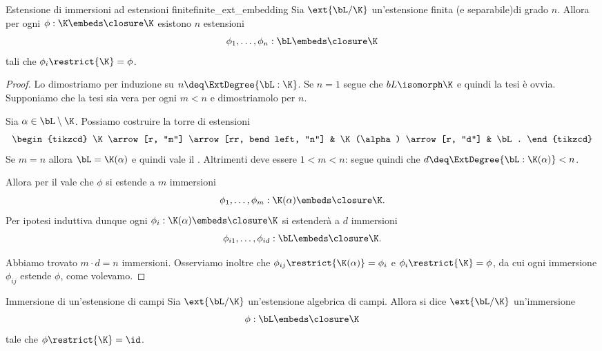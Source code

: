 \begin{theorem}
    {Estensione di immersioni ad estensioni finite}{finite_ext_embedding}
    Sia $\ext{\bL / \K}$ un'estensione finita (e separabile)di grado $n$. Allora per ogni $\phi : \K \embeds \closure\K$ esistono $n$ estensioni \[
        \phi_1, \dots, \phi_n : \bL \embeds \closure\K
    \] tali che $\phi_i\restrict{\K} = \phi$. 
\end{theorem}
\begin{proof}
    Lo dimostriamo per induzione su $n \deq \ExtDegree{\bL : \K}$.
     Se $n = 1$ segue che $bL \isomorph \K$ e quindi la tesi è ovvia.
     Supponiamo che la tesi sia vera per ogni $m < n$ e dimostriamolo per $n$.
    
    Sia $\alpha \in \bL \setminus \K$. Possiamo costruire la torre di estensioni \[
        \begin{tikzcd}
            \K \arrow[r, "m"] \arrow[rr, bend left, "n"] &
            \K(\alpha) \arrow[r, "d"] &
            \bL.
        \end{tikzcd}
    \] Se $m = n$ allora $\bL = \K(\alpha)$ e quindi vale il . Altrimenti deve essere $1 < m < n$: segue quindi che $d \deq \ExtDegree{\bL : \K(\alpha)} < n$.
    
    Allora per il  vale che $\phi$ si estende a $m$ immersioni \[
        \phi_1, \dots, \phi_m : \K(\alpha) \embeds \closure\K.
    \] Per ipotesi induttiva dunque ogni $\phi_i : \K(\alpha) \embeds \closure\K$ si estenderà a $d$ immersioni \[
        \phi_{i1}, \dots, \phi_{id} : \bL \embeds \closure\K.
    \]

    Abbiamo trovato $m \cdot d = n$ immersioni. Osserviamo inoltre che $\phi_{ij}\restrict{\K(\alpha)} = \phi_i$ e $\phi_i\restrict{\K} = \phi$, da cui ogni immersione $\phi_{ij}$ estende $\phi$, come volevamo.
\end{proof}

\begin{definition}
    {Immersione di un'estensione di campi}{}
    Sia $\ext{\bL / \K}$ un'estensione algebrica di campi. Allora si dice  $\ext{\bL / \K}$ un'immersione \[
        \phi : \bL \embeds \closure\K
    \] tale che $\phi\restrict{\K} = \id$. 
\end{definition}